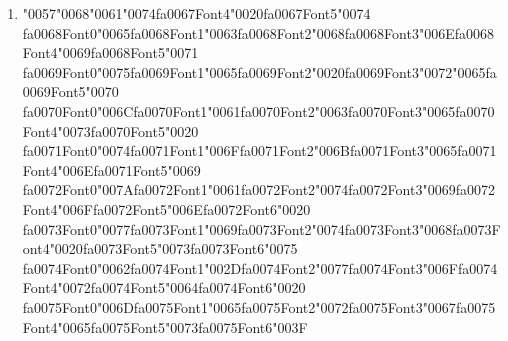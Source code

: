 \documentclass[12pt]{article}
\begin{document}
\begin{enumerate}[label=Q\arabic*.]
\begin{enumerate}[label=(\Alph*)]
    \item DPO trains directly on preference pairs without a separate reward model
    \item DPO requires a value network to compute advantages
    \item DPO prohibits using preference data
    \item DPO only optimizes next-word likelihood
\end{enumerate}
\item {\char"0057}{\char"0068}{\char"0061}{\char"0074}{\csname fa0067Font4\endcsname\char"0020}{\csname fa0067Font5\endcsname\char"0074} {\csname fa0068Font0\endcsname\char"0065}{\csname fa0068Font1\endcsname\char"0063}{\csname fa0068Font2\endcsname\char"0068}{\csname fa0068Font3\endcsname\char"006E}{\csname fa0068Font4\endcsname\char"0069}{\csname fa0068Font5\endcsname\char"0071} {\csname fa0069Font0\endcsname\char"0075}{\csname fa0069Font1\endcsname\char"0065}{\csname fa0069Font2\endcsname\char"0020}{\csname fa0069Font3\endcsname\char"0072}{\char"0065}{\csname fa0069Font5\endcsname\char"0070} {\csname fa0070Font0\endcsname\char"006C}{\csname fa0070Font1\endcsname\char"0061}{\csname fa0070Font2\endcsname\char"0063}{\csname fa0070Font3\endcsname\char"0065}{\csname fa0070Font4\endcsname\char"0073}{\csname fa0070Font5\endcsname\char"0020} {\csname fa0071Font0\endcsname\char"0074}{\csname fa0071Font1\endcsname\char"006F}{\csname fa0071Font2\endcsname\char"006B}{\csname fa0071Font3\endcsname\char"0065}{\csname fa0071Font4\endcsname\char"006E}{\csname fa0071Font5\endcsname\char"0069} {\csname fa0072Font0\endcsname\char"007A}{\csname fa0072Font1\endcsname\char"0061}{\csname fa0072Font2\endcsname\char"0074}{\csname fa0072Font3\endcsname\char"0069}{\csname fa0072Font4\endcsname\char"006F}{\csname fa0072Font5\endcsname\char"006E}{\csname fa0072Font6\endcsname\char"0020} {\csname fa0073Font0\endcsname\char"0077}{\csname fa0073Font1\endcsname\char"0069}{\csname fa0073Font2\endcsname\char"0074}{\csname fa0073Font3\endcsname\char"0068}{\csname fa0073Font4\endcsname\char"0020}{\csname fa0073Font5\endcsname\char"0073}{\csname fa0073Font6\endcsname\char"0075} {\csname fa0074Font0\endcsname\char"0062}{\csname fa0074Font1\endcsname\char"002D}{\csname fa0074Font2\endcsname\char"0077}{\csname fa0074Font3\endcsname\char"006F}{\csname fa0074Font4\endcsname\char"0072}{\csname fa0074Font5\endcsname\char"0064}{\csname fa0074Font6\endcsname\char"0020} {\csname fa0075Font0\endcsname\char"006D}{\csname fa0075Font1\endcsname\char"0065}{\csname fa0075Font2\endcsname\char"0072}{\csname fa0075Font3\endcsname\char"0067}{\csname fa0075Font4\endcsname\char"0065}{\csname fa0075Font5\endcsname\char"0073}{\csname fa0075Font6\endcsname\char"003F}

\end{enumerate}
\end{document}
